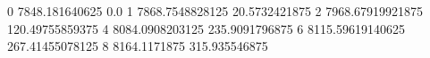 0 7848.181640625 0.0
1 7868.7548828125 20.5732421875
2 7968.67919921875 120.49755859375
4 8084.0908203125 235.9091796875
6 8115.59619140625 267.41455078125
8 8164.1171875 315.935546875
